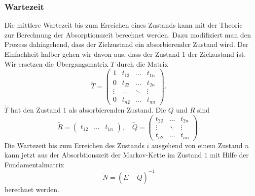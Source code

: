 \subsubsection{Wartezeit}
Die mittlere Wartezeit bis zum Erreichen eines Zustands kann mit der
Theorie zur Berechnung der Absorptionszeit berechnet werden.
Dazu modifiziert man den Prozess dahingehend, dass der Zielzustand
ein absorbierender Zustand wird.
Der Einfachheit halber gehen wir davon aus, dass der Zustand $1$ 
der Zielzustand ist.
Wir ersetzen die Übergangsmatrix $T$ durch die Matrix
\[
\tilde{T}
=
\left(
\begin{array}{c|ccc}
1     &t_{12}&\dots &t_{1n}\\
\hline
0     &t_{22}&\dots &t_{2n}\\
\vdots&\dots &\ddots&\vdots\\
0     &t_{n2}&\dots &t_{nn}
\end{array}\right).
\]
$\tilde{T}$ hat den Zustand $1$ als absorbierenden Zustand.
Die $Q$ und $R$ sind
\[
\tilde{R}
=
\begin{pmatrix}t_{12}&\dots&t_{1n}\end{pmatrix},
\quad
\tilde{Q}
=
\begin{pmatrix}
t_{22}&\dots &t_{2n}\\
\vdots&\ddots&\vdots\\
t_{n2}&\dots &t_{nn}
\end{pmatrix}.
\]
Die Wartezeit bis zum Erreichen des Zustands $i$ ausgehend von einem
Zustand $n$ kann jetzt aus der Absorbtionszeit der Markov-Kette
im Zustand $1$ mit Hilfe der Fundamentalmatrix
\[
\tilde{N} 
=
(E-\tilde{Q})^{-1}
\]
berechnet werden.


